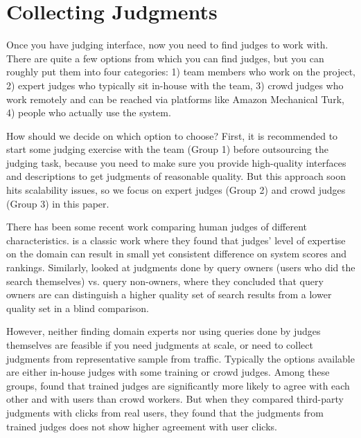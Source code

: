\section{Collecting Judgments}

Once you have judging interface, now you need to find judges to work with. There are quite a few options from which you can find judges, but you can roughly put them into four categories: 1) team members who work on the project, 2) expert judges who typically sit in-house with the team, 3) crowd judges who work remotely and can be reached via platforms like Amazon Mechanical Turk, 4) people who actually use the system. %

How should we decide on which option to choose? First, it is recommended to start some judging exercise with the team (Group 1) before outsourcing the judging task, because you need to make sure you provide high-quality interfaces and descriptions to get judgments of reasonable quality. But this approach soon hits scalability issues, so we focus on expert judges (Group 2) and crowd judges (Group 3) in this paper.

There has been some recent work comparing human judges of different characteristics. \cite{Bailey:2008} is a classic work where they found that judges' level of expertise on the domain can result in small yet consistent difference on system scores and rankings. Similarly, \cite{Chouldechova:2013} looked at judgments done by query owners (users who did the search themselves) vs. query non-owners, where they concluded that query owners are can distinguish a higher quality set of search results from a lower quality set in a blind comparison.

However, neither finding domain experts nor using queries done by judges themselves are feasible if you need judgments at scale, or need to collect judgments from representative sample from traffic. Typically the options available are either in-house judges with some training or crowd judges. Among these groups,  \cite{Kazai:2013} found that trained judges are significantly more likely to agree with each other and with users than crowd workers. But when they compared third-party judgments with clicks from real users, they found that the judgments from trained judges does not show higher agreement with user clicks.%

